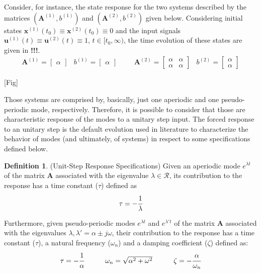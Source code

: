 \documentclass[a4paper,11pt]{book}
\numberwithin{figure}{chapter}
\numberwithin{equation}{chapter}
\numberwithin{table}{chapter}
\theoremstyle{definition}
\newtheorem{definition}{Definition}[chapter]
\begin{document}
Consider, for instance, the state response for the two systems described by the matrices $(\bm{A}^{(1)}, b^{(1)})$ and $(\bm{A}^{(2)}, b^{(2)})$ given below. Considering initial states $\bm{x}^{(1)}(t_0) \equiv \bm{x}^{(2)}(t_0) \equiv 0$ and the input signals $\bm{u}^{(1)}(t) \equiv \bm{u}^{(2)}(t) \equiv 1$, $t \in [t_0, \infty)$, the time evolution of these states are given in \textbf{!!!}.
\begin{equation}
\begin{matrix}
    \bm{A}^{(1)} = \begin{bmatrix} 
        \alpha 
    \end{bmatrix} & b^{(1)} = \begin{bmatrix} \alpha \end{bmatrix} & & & \bm{A}^{(2)} = \begin{bmatrix} 
        \alpha & \alpha \\
        \alpha & \alpha
    \end{bmatrix} & b^{(2)} = \begin{bmatrix} \alpha \\ \alpha \end{bmatrix}
\end{matrix}
\end{equation}

[Fig]

Those systems are comprised by, basically, just one aperiodic and one pseudo-periodic mode, respectively. Therefore, it is possible to consider that those are characteristic response of the modes to a unitary step input. The forced response to an unitary step is the default evolution used in literature to characterize the behavior of modes (and ultimately, of systems) in respect to some specifications defined below.

\begin{definition}{(Unit-Step Response Specifications)}
	Given an aperiodic mode $e^{\lambda t}$ of the matrix $\bm{A}$ associated with the eigenvalue $\lambda \in \mathcal{R}$, its contribution to the response has a time constant ($\tau$) defined as
	\begin{equation}
		\tau = - \cfrac{1}{\lambda}
	\end{equation}	
	
	Furthermore, given pseudo-periodic modes $e^{\lambda t}$ and $e^{\lambda' t}$ of the matrix $\bm{A}$ associated with the eigenvalues $\lambda,\lambda' = \alpha \pm j \omega$, their contribution to the response has a time constant ($\tau$), a natural frequency ($\omega_n$) and a damping coefficient ($\zeta$) defined as:
	\begin{equation}
	\begin{matrix}
		\tau = - \cfrac{1}{\alpha} & & & \omega_n = \sqrt{\alpha^2 + \omega^2} & & & \zeta = - \cfrac{\alpha}{\omega_n}
	\end{matrix}
	\end{equation}
	
\end{definition}   
\end{document}
